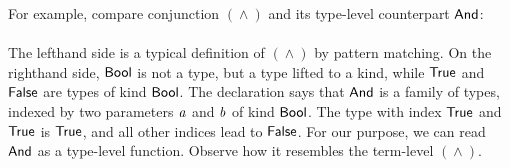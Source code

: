 For example, compare conjunction \ensuremath{(\mathrel{\wedge})} and its type-level
counterpart \ensuremath{\Conid{And}}:\\
\\
The lefthand side is a typical definition of \ensuremath{(\mathrel{\wedge})} by pattern matching.
On the righthand side, \ensuremath{\Conid{Bool}} is not a type, but a type lifted to a kind,
while \ensuremath{\Conid{True}} and \ensuremath{\Conid{False}} are types of kind \ensuremath{\Conid{Bool}}. The declaration says
that \ensuremath{\Conid{And}} is a family of types, indexed by two parameters \ensuremath{\Varid{a}} and \ensuremath{\Varid{b}} of
kind \ensuremath{\Conid{Bool}}. The type with index \ensuremath{\Conid{True}} and \ensuremath{\Conid{True}} is \ensuremath{\Conid{True}}, and all
other indices lead to \ensuremath{\Conid{False}}. For our purpose, we can read \ensuremath{\Conid{And}} as a type-level function. Observe how it resembles the term-level \ensuremath{(\mathrel{\wedge})}.

